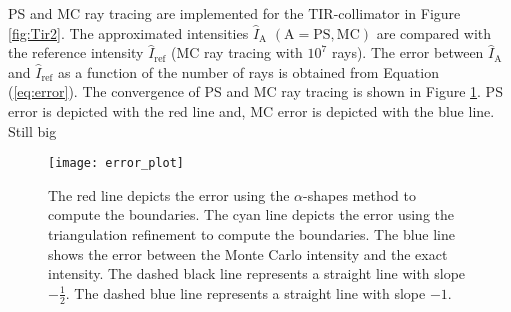  PS and MC ray tracing are implemented for the TIR-collimator in Figure \ref{fig:Tir2}. The approximated intensities $\hat{I}_{\textrm{A}}$ $(\textrm{A} = \textrm{PS}, \textrm{MC})$ are compared with the reference intensity $\hat{I}_{\textrm{ref}}$ (MC ray tracing with $10^7$ rays). The error between $\hat{I}_{\textrm{A}}$ and $\hat{I}_{\textrm{ref}}$ as a function of the number of rays is obtained from Equation (\ref{eq:error}). The convergence of PS and MC ray tracing is shown in Figure \ref{fig:error2}. 
PS error is depicted with the red line and, MC error is depicted with the blue line. Still big 
\begin{figure}[h!]
 \begin{center}
   \texttt{[image: error\_plot]}
    \end{center}
     \caption{\footnotesize{ The red line depicts the error using the $\alpha$-shapes method to compute the boundaries. The cyan line depicts the error using the triangulation refinement to compute the boundaries.
     The blue line shows the error between the Monte Carlo intensity and the exact intensity.
     The dashed black line represents a straight line with slope $-\frac{1}{2}$.
   The dashed blue line represents a straight line with slope $-1$.}}
 \label{fig:error2}
\end{figure}
